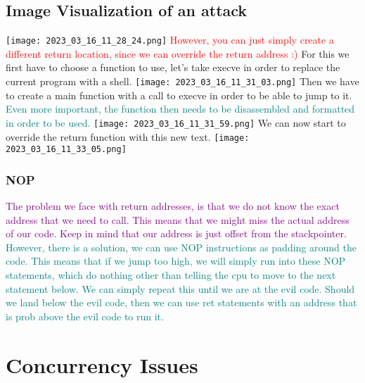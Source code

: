 \documentclass[main.tex,fontsize=8pt,paper=a4,paper=portrait,DIV=calc,]{scrartcl}
\begin{document}
\subsection{Image Visualization of an attack}
\texttt{[image: 2023\_03\_16\_11\_28\_24.png]}\newline
\textcolor{red}{However, you can just simply create a different return location, since we can override the return address :)}\newline
For this we first have to choose a function to use, let's take execve in order to replace the current program with a shell.\newline
\texttt{[image: 2023\_03\_16\_11\_31\_03.png]}\newline
Then we have to create a main function with a call to execve in order to be able to jump to it.\newline
\textcolor{teal}{Even more important, the function then needs to be disassembled and formatted in order to be used.}\newline
\texttt{[image: 2023\_03\_16\_11\_31\_59.png]}\newline
We can now start to override the return function with this new text.\newline
\texttt{[image: 2023\_03\_16\_11\_33\_05.png]}

\subsubsection{NOP}
\textcolor{purple}{The problem we face with return addresses, is that we do not know the exact address that we need to call. This means that we might miss the actual address of our code.\newline
Keep in mind that our address is just offset from the stackpointer. }\newline
\textcolor{teal}{However, there is a solution, we can use NOP instructions as padding around the code. This means that if we jump too high, we will simply run into these NOP statements, which do nothing other than telling the cpu to move to the next statement below.\newline
We can simply repeat this until we are at the evil code.\newline
Should we land below the evil code, then we can use ret statements with an address that is prob above the evil code to run it.}

\section{Concurrency Issues}
\end{document}
